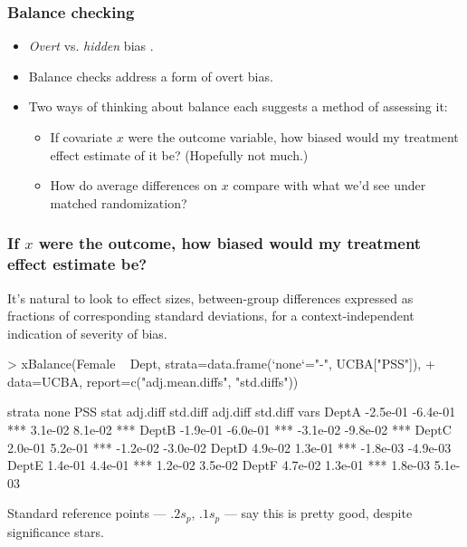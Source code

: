 
\begin{frame}
  \frametitle{Balance checking}
\begin{itemize}
\item \textit{Overt} vs. \textit{hidden} bias \citep{rosenbaum:2002}.
\item Balance checks address a form of overt bias.
\item Two ways of thinking about balance each suggests a method of assessing it:
  \begin{itemize}
  \item If covariate $x$ were the outcome variable, how biased would my treatment effect estimate of it be? (Hopefully not much.)
  \item How do average differences on $x$ compare with what we'd see under matched randomization?
  \end{itemize}
\end{itemize}
\end{frame}

\begin{frame}
  \frametitle{If $x$ were the outcome, how biased would my treatment effect estimate be?}

  It's natural to look to effect sizes, between-group differences
  expressed as fractions of corresponding standard deviations, for a
  context-independent indication of severity of bias.
  
  
\begin{Schunk}
\begin{Sinput}
> xBalance(Female ~ Dept, strata=data.frame(`none`="-", UCBA["PSS"]), 
+ data=UCBA, report=c("adj.mean.diffs", "std.diffs"))
\end{Sinput}
\begin{Soutput}
      strata     none                        PSS                  
      stat   adj.diff std.diff          adj.diff std.diff         
vars                                                              
DeptA        -2.5e-01 -6.4e-01 ***      3.1e-02  8.1e-02  ***     
DeptB        -1.9e-01 -6.0e-01 ***      -3.1e-02 -9.8e-02 ***     
DeptC        2.0e-01  5.2e-01  ***      -1.2e-02 -3.0e-02         
DeptD        4.9e-02  1.3e-01  ***      -1.8e-03 -4.9e-03         
DeptE        1.4e-01  4.4e-01  ***      1.2e-02  3.5e-02          
DeptF        4.7e-02  1.3e-01  ***      1.8e-03  5.1e-03          
\end{Soutput}
\end{Schunk}

Standard reference points --- $.2s_{p}$, $.1s_{p}$ --- say this is
pretty good, despite significance stars.
\end{frame}

